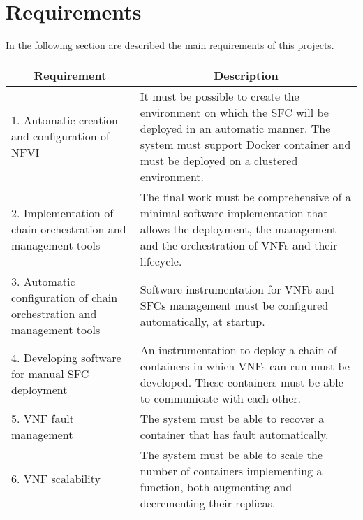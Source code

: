 \section{Requirements}\label{chap:prjan:sec:req}
In the following section are described the main requirements of this projects.

\begin{longtable}[c]{p{}p{}}
\hline
\multicolumn{1}{c}{\textbf{Requirement}}                                & \multicolumn{1}{c}{\textbf{Description}}                                                                                                                                                       \\ \hline
\endhead
%
\hline
\endfoot
%
\endlastfoot
%
1. Automatic creation and configuration of NFVI                         & It must be possible to create the environment on which the SFC will be deployed in an automatic manner. The system must support Docker container and must be deployed on a clustered environment. \\
2. Implementation of chain orchestration and management tools           & The final work must be comprehensive of a minimal software implementation that allows the deployment, the management and the orchestration of VNFs and their lifecycle.                      \\
3. Automatic configuration of chain orchestration and management tools & Software instrumentation for VNFs and SFCs management must be configured automatically, at startup.                                                                                              \\
4. Developing software for manual SFC deployment                        & An instrumentation to deploy a chain of containers in which VNFs can run must be developed. These containers must be able to communicate with each other.                                                \\
5. VNF fault management                                                 & The system must be able to recover a container that has fault automatically.                                                                                                                      \\
6. VNF scalability                                                      & The system must be able to scale the number of containers implementing a function, both augmenting and decrementing their replicas.                                                               \\

\end{longtable}
